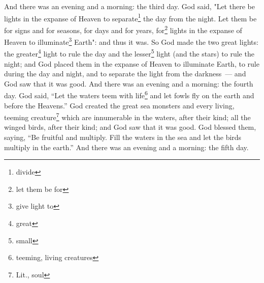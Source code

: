\begin{enumerate}
     And there was an evening and a morning: the third day.%
     God said, "Let there be lights in the expanse of Heaven to separate\footnote{divide} the day from the night. Let them be for signs and for seasons, for days and for years,%
     for\footnote{let them be for} lights in the expanse of Heaven to illuminate\footnote{give light to} Earth": and thus it was.%
     So God made the two great lights: the greater\footnote{great} light to rule the day and the lesser\footnote{small} light (and the stars) to rule the night;%
     and God placed them in the expanse of Heaven to illuminate Earth,%
     to rule during the day and night, and to separate the light from the darkness~--- and God saw that it was good.%
     And there was an evening and a morning: the fourth day.%
     God said, ``Let the waters teem with life\footnote{teeming, living creatures} and let fowls fly on the earth and before the Heavens.''%
     God created the great sea monsters and every living, teeming creature\footnote{Lit., soul} which are innumerable in the waters, after their kind; all the winged birds, after their kind; and God saw that it was good.%
     God blessed them, saying, ``Be fruitful and multiply. Fill the waters in the sea and let the birds multiply in the earth.''%
     And there was an evening and a morning: the fifth day.%
\end{enumerate}
